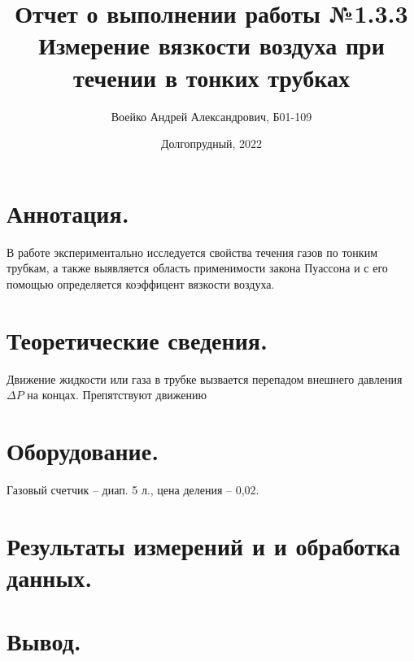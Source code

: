 ﻿\documentclass[a4paper,11pt]{article}
\title{Отчет о выполнении работы №1.3.3\\Измерение вязкости воздуха при течении в тонких трубках}
\author{Воейко Андрей Александрович, Б01-109}
\date{Долгопрудный, 2022}
\begin{document}
\maketitle
\newpage
\section{Аннотация.}
В работе экспериментально исследуется свойства течения газов по тонким трубкам, а также выявляется область применимости закона Пуассона и с его помощью определяется коэффицент вязкости воздуха.
\section{Теоретические сведения.}
Движение жидкости или газа в трубке вызвается перепадом внешнего давления $\Delta P$ на концах. Препятствуют движению
\section{Оборудование.}
Газовый счетчик -- диап. 5 л., цена деления -- 0,02.
\section{Результаты измерений и и обработка данных.}
\section{Вывод.}
\end{document}
